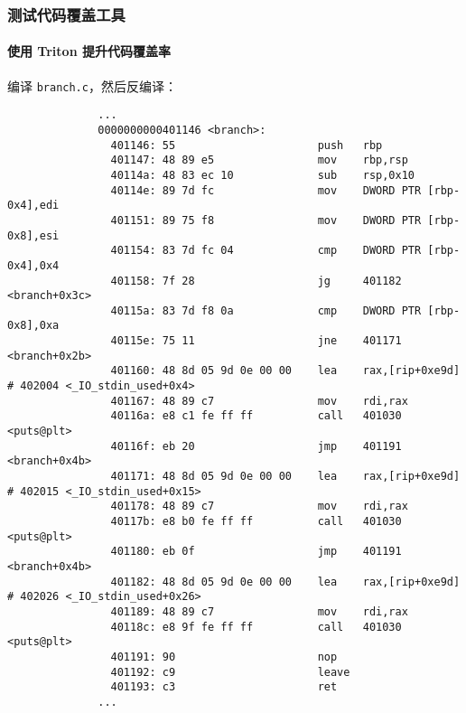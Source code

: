 \documentclass{ctexbeamer}
\begin{document}
    \begin{frame}[fragile]
        \frametitle{测试代码覆盖工具}
        \framesubtitle{使用 Triton 提升代码覆盖率}
    
        编译 \texttt{branch.c}，然后反编译：

        {
            \tiny
            \begin{verbatim}
              ...
              0000000000401146 <branch>:
                401146:	55                   	push   rbp
                401147:	48 89 e5             	mov    rbp,rsp
                40114a:	48 83 ec 10          	sub    rsp,0x10
                40114e:	89 7d fc             	mov    DWORD PTR [rbp-0x4],edi
                401151:	89 75 f8             	mov    DWORD PTR [rbp-0x8],esi
                401154:	83 7d fc 04          	cmp    DWORD PTR [rbp-0x4],0x4
                401158:	7f 28                	jg     401182 <branch+0x3c>
                40115a:	83 7d f8 0a          	cmp    DWORD PTR [rbp-0x8],0xa
                40115e:	75 11                	jne    401171 <branch+0x2b>
                401160:	48 8d 05 9d 0e 00 00 	lea    rax,[rip+0xe9d]        # 402004 <_IO_stdin_used+0x4>
                401167:	48 89 c7             	mov    rdi,rax
                40116a:	e8 c1 fe ff ff       	call   401030 <puts@plt>
                40116f:	eb 20                	jmp    401191 <branch+0x4b>
                401171:	48 8d 05 9d 0e 00 00 	lea    rax,[rip+0xe9d]        # 402015 <_IO_stdin_used+0x15>
                401178:	48 89 c7             	mov    rdi,rax
                40117b:	e8 b0 fe ff ff       	call   401030 <puts@plt>
                401180:	eb 0f                	jmp    401191 <branch+0x4b>
                401182:	48 8d 05 9d 0e 00 00 	lea    rax,[rip+0xe9d]        # 402026 <_IO_stdin_used+0x26>
                401189:	48 89 c7             	mov    rdi,rax
                40118c:	e8 9f fe ff ff       	call   401030 <puts@plt>
                401191:	90                   	nop
                401192:	c9                   	leave
                401193:	c3                   	ret
              ...
            \end{verbatim}
        }
    
    \end{frame}
\end{document}
